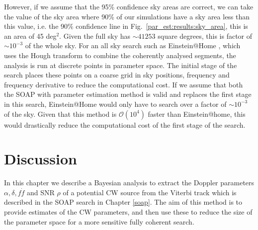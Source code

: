 However, if we assume that the 95\% confidence sky areas are correct, we can
take the value of the sky area where 90\% of our simulations have a sky area
less than this value, i.e. the 90\% confidence line in
Fig.~\ref{par_est:results:sky_area}, this is an area of 45 deg$^2$.  Given the
full sky has $\sim 41253$ square degrees, this is factor of $\sim 10^{-3}$ of
the whole sky.  For an all sky search such as Einstein@Home
\citep{theligoscientificcollaborationandthevirgocollaboration2013EinsteinHome,singh2016ResultsAllsky},
which uses the Hough transform \citep{krishnan2004HoughTransform} to combine
the coherently analysed segments, the analysis is run at discrete points in
parameter space. The initial stage of the search places these points on a
coarse grid in sky positions, frequency and frequency derivative to reduce the
computational cost.  If we assume that both the SOAP with parameter estimation
method is valid and replaces the first stage in this search, Einstein@Home
would only have to search over a factor of $\sim 10^{-3}$ of the sky.  Given
that this method is $\mathcal{O}(10^4)$ faster than Einstein@home, this would
drastically reduce the computational cost of the first stage of the search.
~


%
%
\section{Discussion}
%
%

In this chapter we describe a Bayesian
analysis to extract the Doppler parameters $\alpha, \delta, f \dot{f}$ and
\gls{SNR} $\rho$ of a potential \gls{CW} source from the Viterbi track which is
described in the SOAP search in Chapter \ref{soap}. The aim of
this method is to provide estimates of the \gls{CW} parameters, and then use
these to reduce the size of the parameter space for a more sensitive fully coherent search. 

